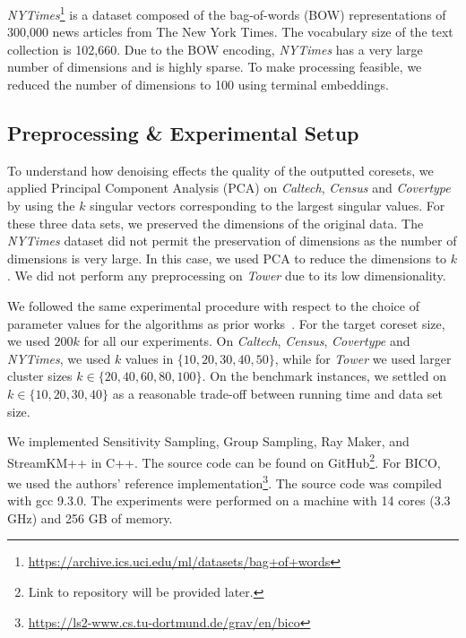 \textit{NYTimes}\footnote{\url{https://archive.ics.uci.edu/ml/datasets/bag+of+words}} is a dataset composed of the bag-of-words (BOW) representations of 300,000 news articles from The New York Times. The vocabulary size of the text collection is 102,660. Due to the BOW encoding, \textit{NYTimes} has a very large number of dimensions and is highly sparse. To make processing feasible, we reduced the number of dimensions to 100 using terminal embeddings.

\subsection{Preprocessing \& Experimental Setup}
To understand how denoising effects the quality of the outputted coresets, we applied Principal Component Analysis (PCA) on \textit{Caltech}, \textit{Census} and \textit{Covertype} by using the $k$ singular vectors corresponding to the largest singular values. For these three data sets, we preserved the dimensions of the original data.  
The \textit{NYTimes} dataset did not permit the preservation of dimensions as the number of dimensions is very large. In this case, we used PCA to reduce the dimensions to $k$.
We did not perform any preprocessing on \textit{Tower} due to its low dimensionality.

We followed the same experimental procedure with respect to the choice of parameter values for the algorithms as prior works~\cite{AckermannMRSLS12, FGSSS13}. For the target coreset size, we used $200k$ for all our experiments. On \textit{Caltech}, \textit{Census},  \textit{Covertype} and \textit{NYTimes}, we used $k$ values in $\{10, 20, 30, 40, 50\}$, while for \textit{Tower} we used larger cluster sizes $k \in \{20, 40, 60, 80, 100\}$. On the benchmark instances, we settled on $k \in \{10, 20, 30, 40\}$ as a reasonable trade-off between running time and data set size.


We implemented Sensitivity Sampling, Group Sampling, Ray Maker, and StreamKM++ in C++. The source code can be found on GitHub\footnote{Link to repository will be provided later.}. For BICO, we used the authors' reference implementation\footnote{\url{https://ls2-www.cs.tu-dortmund.de/grav/en/bico}}. The source code was compiled with gcc 9.3.0. The experiments were performed on a machine with 14 cores (3.3 GHz) and 256 GB of memory.





